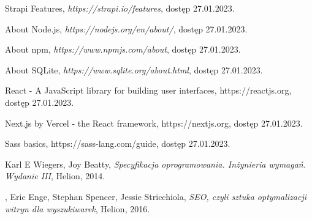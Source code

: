 \documentclass[12pt]{article}
\numberwithin{figure}{section}
\begin{document}
\begin{sloppypar}
\begin{thebibliography}{99}
    Strapi Features,
    \textit{https://strapi.io/features},
    dostęp 27.01.2023.

    About Node.js,
    \textit{https://nodejs.org/en/about/},
    dostęp 27.01.2023.

    About npm,
    \textit{https://www.npmjs.com/about},
    dostęp 27.01.2023.

    About SQLite,
    \textit{https://www.sqlite.org/about.html},
    dostęp 27.01.2023.

    React - A JavaScript library for building user interfaces,
    {https://reactjs.org},
    dostęp 27.01.2023.

    Next.js by Vercel - the React framework,
    {https://nextjs.org},
    dostęp 27.01.2023. 

    Sass basics,
    {https://sass-lang.com/guide},
    dostęp 27.01.2023.

    Karl E Wiegers, Joy Beatty,
    \textit{Specyfikacja oprogramowania. Inżynieria wymagań. Wydanie III},
    Helion,
    2014.
    
    ,
    Eric Enge, Stephan Spencer, Jessie Stricchiola,
    \textit{SEO, czyli sztuka optymalizacji witryn dla wyszukiwarek},
    Helion,
    2016.

        
\end{thebibliography}

\end{sloppypar}
\end{document}
